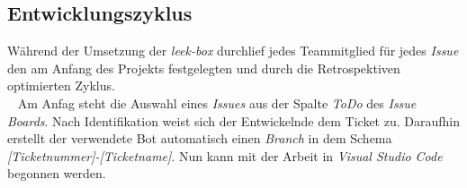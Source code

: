 \documentclass[10pt, a4paper]{article}
\begin{document}
\begin{onehalfspace}
  \subsection{Entwicklungszyklus}
    Während der Umsetzung der \textit{leek-box} durchlief jedes Teammitglied für jedes \textit{Issue} den am Anfang des Projekts festgelegten und
    durch die Retrospektiven optimierten Zyklus.
    \\~
    Am Anfag steht die Auswahl eines \textit{Issues} aus der Spalte \textit{ToDo} des \textit{Issue Boards}.
    Nach Identifikation weist sich der Entwickelnde dem Ticket zu. Daraufhin erstellt der verwendete Bot automatisch einen \textit{Branch}
    in dem Schema \textit{[Ticket\-nummer]-[Ticketname]}. Nun kann mit der Arbeit in \textit{Visual Studio Code} begonnen werden.
    \\~

\end{onehalfspace}
\end{document}
